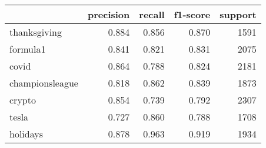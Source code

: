 \begin{tabular}{lrrrr}
\toprule
{} &  precision &  recall &  f1-score &  support \\
\midrule
thanksgiving    &      0.884 &   0.856 &     0.870 &     1591 \\
formula1        &      0.841 &   0.821 &     0.831 &     2075 \\
covid           &      0.864 &   0.788 &     0.824 &     2181 \\
championsleague &      0.818 &   0.862 &     0.839 &     1873 \\
crypto          &      0.854 &   0.739 &     0.792 &     2307 \\
tesla           &      0.727 &   0.860 &     0.788 &     1708 \\
holidays        &      0.878 &   0.963 &     0.919 &     1934 \\
\bottomrule
\end{tabular}
